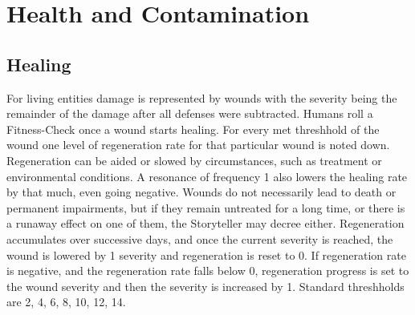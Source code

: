 \section{Health and Contamination}\label{sec:healthandcontamination}
\subsection{Healing}\label{subsec:healing2}
For living entities damage is represented by wounds with the severity being the remainder of the damage after all
defenses were subtracted.
Humans roll a Fitness-Check once a wound starts healing.
For every met threshhold of the wound one level of regeneration rate for that particular wound is noted down.
Regeneration can be aided or slowed by circumstances, such as treatment or environmental conditions.
A resonance of frequency 1 also lowers the healing rate by that much, even going negative.
Wounds do not necessarily lead to death or permanent impairments, but if they remain untreated for a long time, or there
is a runaway effect on one of them, the Storyteller may decree either.
Regeneration accumulates over successive days, and once the current severity is reached, the wound is lowered by 1
severity and regeneration is reset to 0.
If regeneration rate is negative, and the regeneration rate falls below 0, regeneration progress is set to the wound
severity and then the severity is increased by 1.
Standard threshholds are 2, 4, 6, 8, 10, 12, 14.
